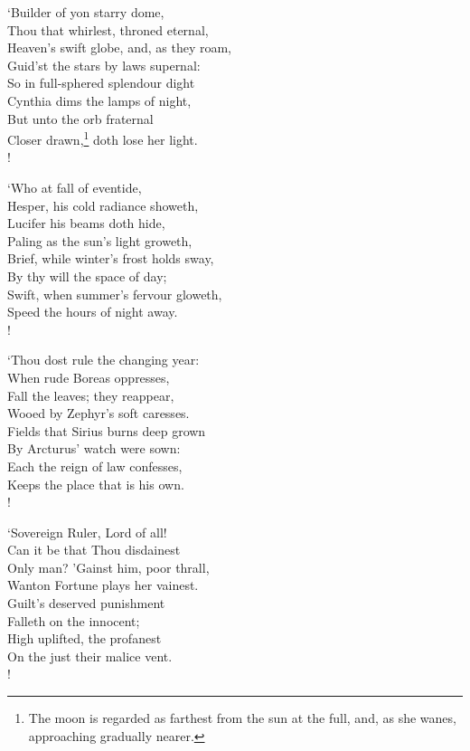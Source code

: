 \documentclass[12pt]{book}
\newenvironment{vpoem}[1]%
  {\def\poemvsindentlines{#1}\begin{poem}\small}%
  {\end{poem}\def\poemvsindentlines{\relax}}
\begin{document}
\begin{vpoem}{24568}
    `Builder of yon starry dome, \\
      Thou that whirlest, throned eternal, \\
    Heaven's swift globe, and, as they roam, \\
      Guid'st the stars by laws supernal: \\
        So in full-sphered splendour dight \\
        Cynthia dims the lamps of night, \\
      But unto the orb fraternal \\
        Closer drawn,\footnote{The moon is regarded as farthest from the sun at the full, and, as she wanes, approaching gradually nearer.} doth lose her light. \\!

    `Who at fall of eventide, \\
      Hesper, his cold radiance showeth, \\
    Lucifer his beams doth hide, \\
      Paling as the sun's light groweth, \\
        Brief, while winter's frost holds sway, \\
        By thy will the space of day; \\
      Swift, when summer's fervour gloweth, \\
        Speed the hours of night away. \\!

    `Thou dost rule the changing year: \\
      When rude Boreas oppresses, \\
    Fall the leaves; they reappear, \\
      Wooed by Zephyr's soft caresses. \\
        Fields that Sirius burns deep grown \\
        By Arcturus' watch were sown: \\
      Each the reign of law confesses, \\
        Keeps the place that is his own. \\!

    `Sovereign Ruler, Lord of all! \\
      Can it be that Thou disdainest \\
    Only man? 'Gainst him, poor thrall, \\
      Wanton Fortune plays her vainest. \\
        Guilt's deserved punishment \\
        Falleth on the innocent; \\
      High uplifted, the profanest \\
        On the just their malice vent. \\!


\end{vpoem}
\end{document}
